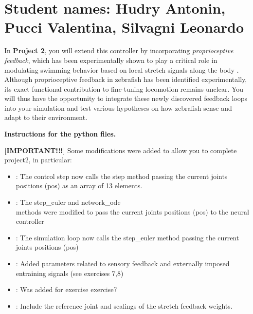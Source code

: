 \documentclass{cmc}
\begin{document}
\pagestyle{fancy}
 

\section*{Student names: Hudry Antonin, Pucci Valentina, Silvagni Leonardo}


In \textbf{Project 2}, you will extend this controller by incorporating \emph{proprioceptive feedback}, which has been experimentally shown to play a critical role in modulating swimming behavior based on local stretch signals along the body \cite{picton_spinal_2021}. Although proprioceptive feedback in zebrafish has been identified experimentally, its exact functional contribution to fine-tuning locomotion remains unclear. You will thus have the opportunity to integrate these newly discovered feedback loops into your simulation and test various hypotheses on how zebrafish sense and adapt to their environment.

\noindent
\textbf{Instructions for the python files. }

\textbf{[IMPORTANT!!!]} Some modifications were added to allow you to complete project2, in particular:
\begin{itemize}
\item {} : The control step now calls the step method passing the current joints positions (pos) as an array of 13 elements.
\item {} : The step\_euler and network\_ode \\ methods were modified to pass the current joints positions (pos) to the neural controller
\item {} : The simulation loop now calls the step\_euler method passing the current joints positions (pos)
\item {} : Added parameters related to sensory feedback and externally imposed entraining signals (see exercises 7,8)
\item {} : Was added for exercise exercise7
\item {} : Include the reference joint and scalings of the stretch feedback weights.
\end{itemize}
\end{document}
